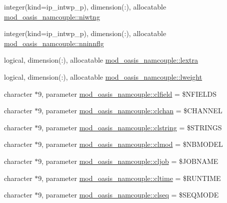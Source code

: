 \begin{DoxyCompactItemize}
\item 
integer(kind=ip\+\_\+intwp\+\_\+p), dimension(\+:), allocatable \hyperlink{namespacemod__oasis__namcouple_a3379333e7d0f24b776c81b1087f3a3b4}{mod\+\_\+oasis\+\_\+namcouple\+::niwtng}
\item 
integer(kind=ip\+\_\+intwp\+\_\+p), dimension(\+:), allocatable \hyperlink{namespacemod__oasis__namcouple_a6526a92cd5fa662f9da229806d062dc2}{mod\+\_\+oasis\+\_\+namcouple\+::nninnflg}
\item 
logical, dimension(\+:), allocatable \hyperlink{namespacemod__oasis__namcouple_a2febd0d97dea9ecc3ce4a8c5088a8d1f}{mod\+\_\+oasis\+\_\+namcouple\+::lextra}
\item 
logical, dimension(\+:), allocatable \hyperlink{namespacemod__oasis__namcouple_a8d88d0c1b22ea43a9429f9e3a653a64b}{mod\+\_\+oasis\+\_\+namcouple\+::lweight}
\item 
character $\ast$9, parameter \hyperlink{namespacemod__oasis__namcouple_a1c3afcba25a8ba41738104d42a59e423}{mod\+\_\+oasis\+\_\+namcouple\+::clfield} = \textquotesingle{}\$N\+F\+I\+E\+L\+DS \textquotesingle{}
\item 
character $\ast$9, parameter \hyperlink{namespacemod__oasis__namcouple_ac0ead9ca992504e9b580db2678926b68}{mod\+\_\+oasis\+\_\+namcouple\+::clchan} = \textquotesingle{}\$C\+H\+A\+N\+N\+EL \textquotesingle{}
\item 
character $\ast$9, parameter \hyperlink{namespacemod__oasis__namcouple_a4dde076bf8cce410eebbd878f791e32e}{mod\+\_\+oasis\+\_\+namcouple\+::clstring} = \textquotesingle{}\$S\+T\+R\+I\+N\+GS \textquotesingle{}
\item 
character $\ast$9, parameter \hyperlink{namespacemod__oasis__namcouple_aa5cc4d0530b3e755441ef9ef70d8083b}{mod\+\_\+oasis\+\_\+namcouple\+::clmod} = \textquotesingle{}\$N\+B\+M\+O\+D\+EL \textquotesingle{}
\item 
character $\ast$9, parameter \hyperlink{namespacemod__oasis__namcouple_afbdcab2dcd637c9c70db27c8c46bd2d7}{mod\+\_\+oasis\+\_\+namcouple\+::cljob} = \textquotesingle{}\$J\+O\+B\+N\+A\+ME \textquotesingle{}
\item 
character $\ast$9, parameter \hyperlink{namespacemod__oasis__namcouple_a21a2ef5048e9fc9551821e8a0b8dec0b}{mod\+\_\+oasis\+\_\+namcouple\+::cltime} = \textquotesingle{}\$R\+U\+N\+T\+I\+ME \textquotesingle{}
\item 
character $\ast$9, parameter \hyperlink{namespacemod__oasis__namcouple_a0d0b7fa2be2a8202344c0ef9085c1309}{mod\+\_\+oasis\+\_\+namcouple\+::clseq} = \textquotesingle{}\$S\+E\+Q\+M\+O\+DE \textquotesingle{}

\end{DoxyCompactItemize}
